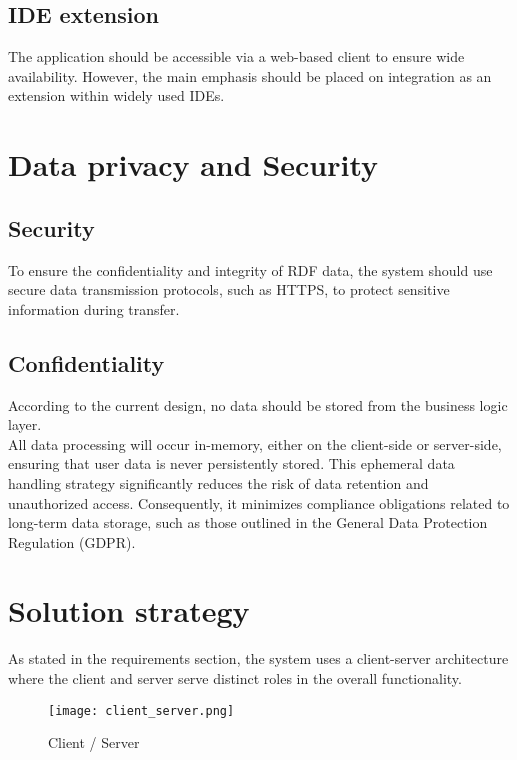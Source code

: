 \subsection{IDE extension\label{sec:reqsuba}}
The application should be accessible via a web-based client to ensure wide availability. However, the main emphasis should be placed on integration as an extension within widely used IDEs.

\section{Data privacy and Security\label{sec:techreq}}

\subsection{Security\label{sec:reqsuba}}
To ensure the confidentiality and integrity of RDF data, the system should use secure data transmission protocols, such as HTTPS, to protect sensitive information during transfer.

\subsection{Confidentiality\label{sec:reqsuba}}
According to the current design, no data should be stored from the business logic layer. 
\\
All data processing will occur in-memory, either on the client-side or server-side, ensuring that user data is never persistently stored. This ephemeral data handling strategy significantly reduces the risk of data retention and unauthorized access. Consequently, it minimizes compliance obligations related to long-term data storage, such as those outlined in the General Data Protection Regulation (GDPR). 

\section{Solution strategy\label{sec:techreq}}
As stated in the requirements section, the system uses a client-server architecture where the client and server serve distinct roles in the overall functionality.

\begin{figure}[H]
    \centering
    \texttt{[image: client\_server.png]}\\
    \caption{Client / Server}\label{fig:client_server}
\end{figure}

